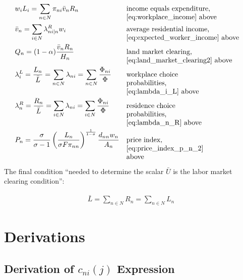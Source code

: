 \documentclass[10pt]{article}
\begin{document}
\begin{align}
    &w_i L_i=\sum_{n \in N} \pi_{n i} \bar{v}_n R_n && \parbox[t]{6cm}{\raggedright income equals expenditure, \eqref{eq:workplace_income} above} \\
    &\bar{v}_n=\sum_{i \in N} \lambda_{n i \mid n}^R w_i && \parbox[t]{6cm}{\raggedright average residential income, \eqref{eq:expected_worker_income} above} \\
    &Q_n=(1-\alpha) \frac{\bar{v}_n R_n}{H_n} && \parbox[t]{6cm}{\raggedright land market clearing, \eqref{eq:land_market_clearing2} above} \\
    &\lambda_i^L=\frac{L_n}{\bar{L}}=\sum_{n \in N} \lambda_{n i}=\sum_{n \in N} \frac{\Phi_{n i}}{\Phi} && \parbox[t]{4cm}{\raggedright workplace choice probabilities, \eqref{eq:lambda_i_L} above} \\
    &\lambda_n^R=\frac{R_n}{\bar{L}}=\sum_{i \in N} \lambda_{n i}=\sum_{i \in N} \frac{\Phi_{n i}}{\Phi} && \parbox[t]{4cm}{\raggedright residence choice probabilities, \eqref{eq:lambda_n_R} above} \\
    &P_n =\frac{\sigma}{\sigma-1}\left(\frac{L_n}{\sigma F \pi_{n n}}\right)^{\frac{1}{1-\sigma}} \frac{d_{n n} w_n}{A_n} && \parbox[t]{4cm}{\raggedright price index, \eqref{eq:price_index_p_n_2} above} \\
\end{align}

The final condition 
``needed to determine the scalar $\bar{U}$ is the labor
market clearing condition'':

\begin{align}
    \bar{L}=\sum_{n \in N} R_n=\sum_{n \in N} L_n
\end{align}






\section{Derivations}


\subsection{Derivation of $c_{n i}(j)$ Expression} 
\label{sec:good_nij_consumption}
\end{document}
